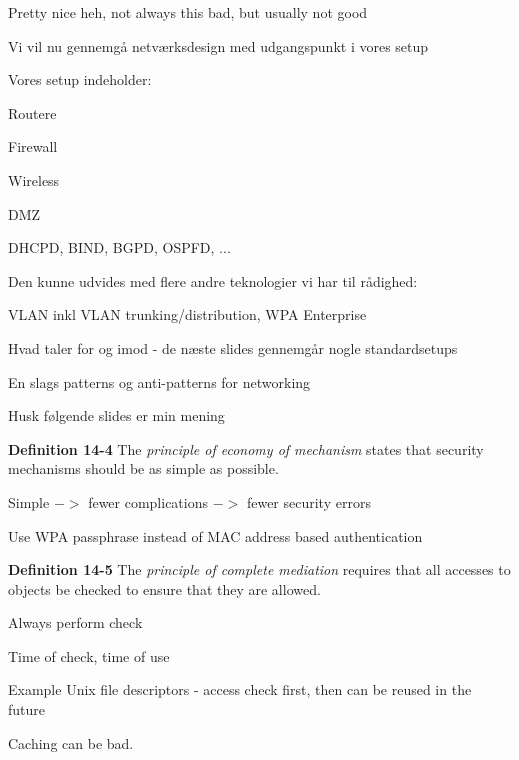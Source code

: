 \documentclass[Screen16to9,17pt]{foils}
\begin{document}


\centerline{Pretty nice heh, not always this bad, but usually not good}


\begin{list1}
\item Vi vil nu gennemgå netværksdesign med udgangspunkt i vores setup
\item Vores setup indeholder:
\begin{list2}
\item Routere
\item Firewall
\item Wireless
\item DMZ
\item DHCPD, BIND, BGPD, OSPFD, ...
\end{list2}
\item Den kunne udvides med flere andre teknologier vi har til rådighed:
\begin{list2}
\item VLAN inkl VLAN trunking/distribution, WPA Enterprise
\end{list2}
\item Hvad taler for og imod - de næste slides gennemgår nogle standardsetups
\item En slags patterns og
anti-patterns for networking
\item Husk følgende slides er min mening
\end{list1}



\begin{list1}
\item {\bf Definition 14-4} The \emph{principle of economy of mechanism} states that security mechanisms should be as simple as possible.
\item Simple $->$ fewer complications $->$ fewer security errors
\item Use WPA passphrase instead of MAC address based authentication
\item
\end{list1}



\begin{list1}
\item {\bf Definition 14-5} The \emph{principle of complete mediation} requires that all accesses to objects be checked to ensure that they are allowed.
\item Always perform check
\item Time of check, time of use
\item Example Unix file descriptors - access check first, then can be reused in the future
\item Caching can be bad.
\end{list1}
\end{document}
